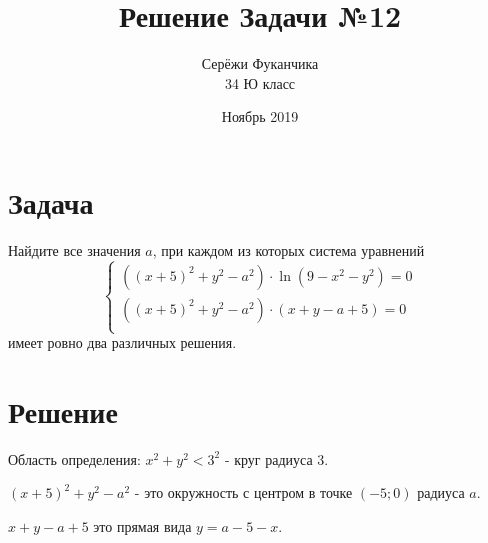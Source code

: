\documentclass{article}
\title{Решение Задачи №12}
\author{Серёжи Фуканчика\\34 Ю класс}
\date{Ноябрь 2019}
\begin{document}
\maketitle

\section{Задача}
Найдите все значения $a$, при каждом из которых система уравнений
$$
\begin{cases}
  \left((x+5)^2+y^2-a^2\right)\cdot{}\ln{\left(9-x^2-y^2\right)}=0 \\ 
  \left((x+5)^2+y^2-a^2\right)\cdot{}\left(x+y-a+5\right)=0 \\ 
\end{cases}
$$
имеет ровно два различных решения.
\section{Решение}
Область определения: $x^2+y^2<3^2$ - круг радиуса 3.

$(x+5)^2+y^2-a^2$ - это окружность с центром в точке $(-5;0)$ радиуса $a$.

$x+y-a+5$ это прямая вида $y=a-5-x$.

\end{document}
